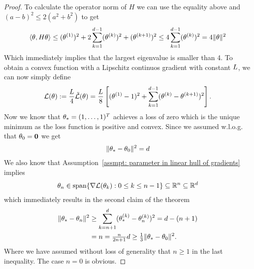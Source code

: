 \begin{proof}
	To calculate the operator norm of \(H\) we can use the equality above and	
	\((a-b)^2 \le 2(a^2 + b^2)\) to get
	\begin{align*}
		\langle \theta, H\theta\rangle
		\le (\theta^{(1)})^2 + 2\sum_{k=1}^{d-1}(\theta^{(k)})^2 + (\theta^{(k+1)})^2 
		\le 4 \sum_{k=1}^{d-1} (\theta^{(k)})^2
		= 4 \|\theta\|^2
	\end{align*}
	Which immediately implies that the largest eigenvalue is smaller than 4. To
	obtain a convex function with a Lipschitz continuos gradient with constant
	\(L\), we can now simply define
	\begin{align*}
		\mathcal{L}(\theta):= \frac{L}{4}\tilde{\mathcal{L}}(\theta)
		= \frac{L}{8}\left[
			(\theta^{(1)}-1)^2
			+ \sum_{k=1}^{d-1} (\theta^{(k)}-\theta^{(k+1)})^2
		\right].
	\end{align*}
	Now we know that \(\theta_* = (1,\dots,1)^T\) achieves a loss of zero which is
	the unique minimum as the loss function is positive and convex. Since we
	assumed w.l.o.g. that \(\theta_0=\mathbf{0}\) we get
	\begin{align}\label{eq: initial distance}
		\|\theta_* - \theta_0\|^2 = d
	\end{align}
	We also know
	that Assumption~\ref{assmpt: parameter in linear hull of gradients} implies
	\begin{align*}
		\theta_n \in \text{span}\{\nabla\mathcal{L}(\theta_k): 0 \le k \le n-1\}
		\subseteq \mathbb{R}^n \subseteq \mathbb{R}^d
	\end{align*}
	which immediately results in the second claim of the theorem
	\begin{align*}
		\|\theta_* - \theta_n\|^2
		&\ge \sum_{k=n+1}^d (\theta_*^{(k)}- \theta_n^{(k)})^2
		= d-(n+1) \\
		&= n = \tfrac{n}{2n+1} d
		\ge \tfrac13 \|\theta_* - \theta_0\|^2. 
	\end{align*}
	Where we have assumed without loss of generality that \(n\ge1\) in the last
	inequality. The case \(n=0\) is obvious.


\end{proof}
